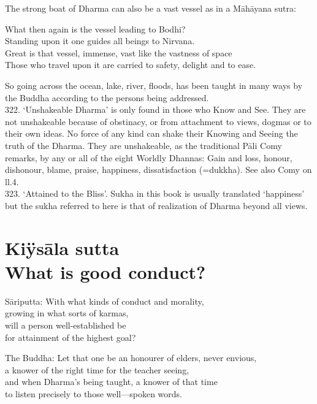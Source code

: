 The strong boat of Dharma can also be a vast vessel as in a M\=ah\=ayana sutra:

\begin{MyDescription}[]{}
What then again is the vessel leading to Bodhi?\\
Standing upon it one guides all beings to Nirvana.\\
Great is that vessel, immense, vast like the vastness of space\\
Those who travel upon it are carried to safety, delight and to ease.
\end{MyDescription}

So going across the ocean, lake, river, ﬂoods, has been taught in many ways by the Buddha according to the persons being addressed.\\
   
322. `Unshakeable Dharma' is only found in those who Know and See. They are not unshakeable because of obstinacy, or from attachment to views, dogmas or to their own ideas. No force of any kind can shake their Knowing and Seeing the truth of the Dharma. They are unshakeable, as the traditional P\=ali Comy remarks, by any or all of the eight Worldly Dhannas: Gain and loss, honour, dishonour, blame, praise, happiness, dissatisfaction (=dukkha). See also Comy on ll.4.\\

323. `Attained to the Bliss'. Sukha in this book is usually translated `happiness' but the sukha referred to here is that of realization of Dharma beyond all views.
 
\chapter{Ki\"ys\=ala sutta\\ What is good conduct?}
\begin{MyDescription}{S\=ariputta:}
With what kinds of conduct and morality,\\
growing in what sorts of karmas,\\
will a person well-established be\\
for attainment of the highest goal?
\end{MyDescription}
   
\begin{MyDescription}{The Buddha:}
Let that one be an honourer of elders, never envious,\\
a knower of the right time for the teacher seeing,\\
and when Dharma's being taught, a knower of that time\\
to listen precisely to those well—spoken words.
\end{MyDescription}


